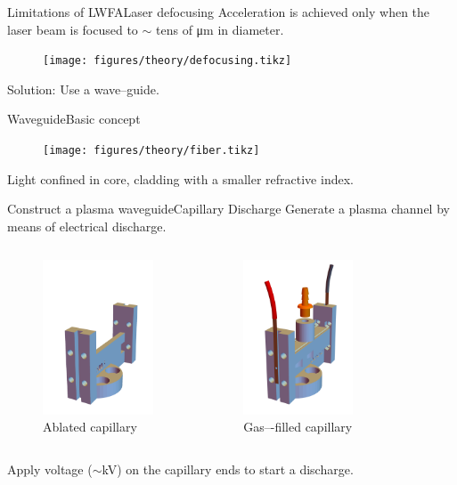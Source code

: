 \documentclass[dvipsnames]{beamer}
\begin{document}
\begin{frame}{Limitations of LWFA}{Laser defocusing}
Acceleration is achieved only when the laser beam is focused to $\sim$ tens of \si{\um} in diameter.
\begin{figure}
\centering
\texttt{[image: figures/theory/defocusing.tikz]}
\end{figure}
Solution: Use a wave--guide.
\end{frame}

\begin{frame}{Waveguide}{Basic concept}
 \begin{figure}
 \texttt{[image: figures/theory/fiber.tikz]}
  \end{figure}
  Light confined in core, cladding with a smaller refractive index.
\end{frame}
\begin{frame}{Construct a plasma waveguide}{Capillary Discharge}
Generate a plasma channel by means of electrical discharge.
\begin{columns}
\begin{figure}
 \centering
 \includegraphics[height=130pt]{figures/theory/ablated.png}
 \caption{Ablated capillary}
\end{figure}
\begin{figure}
\centering
\includegraphics[height=130pt]{figures/theory/gasfilled_with_barb.png}
\caption{Gas–-filled capillary}
\end{figure}
\end{columns}
Apply voltage ($\sim$\si{\kV}) on the capillary ends to start a discharge.
\end{frame}
\end{document}
